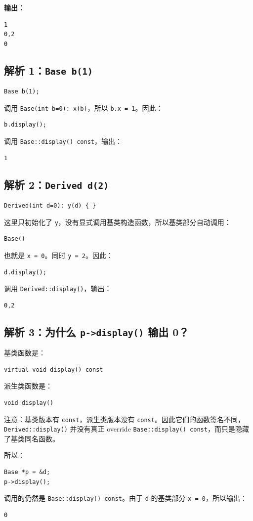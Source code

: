 \documentclass[11pt, a4paper]{article}
\begin{document}
\textbf{输出：}
\begin{lstlisting}
1
0,2
0
\end{lstlisting}

\subsection*{解析 1：\texttt{Base b(1)}}
\begin{lstlisting}
Base b(1);
\end{lstlisting}
调用 \texttt{Base(int b=0): x(b)}，所以 \texttt{b.x = 1}。因此：
\begin{lstlisting}
b.display();
\end{lstlisting}
调用 \texttt{Base::display() const}，输出：
\begin{lstlisting}
1
\end{lstlisting}

\subsection*{解析 2：\texttt{Derived d(2)}}
\begin{lstlisting}
Derived(int d=0): y(d) { }
\end{lstlisting}
这里只初始化了 \texttt{y}，没有显式调用基类构造函数，所以基类部分自动调用：
\begin{lstlisting}
Base()
\end{lstlisting}
也就是 \texttt{x = 0}。同时 \texttt{y = 2}。因此：
\begin{lstlisting}
d.display();
\end{lstlisting}
调用 \texttt{Derived::display()}，输出：
\begin{lstlisting}
0,2
\end{lstlisting}

\subsection*{解析 3：为什么 \texttt{p->display()} 输出 0？}
基类函数是：
\begin{lstlisting}
virtual void display() const
\end{lstlisting}
派生类函数是：
\begin{lstlisting}
void display()
\end{lstlisting}
注意：基类版本有 \texttt{const}，派生类版本没有 \texttt{const}。因此它们的函数签名不同，\texttt{Derived::display()} 并没有真正 override \texttt{Base::display() const}，而只是隐藏了基类同名函数。

所以：
\begin{lstlisting}
Base *p = &d;
p->display();
\end{lstlisting}
调用的仍然是 \texttt{Base::display() const}。由于 \texttt{d} 的基类部分 \texttt{x = 0}，所以输出：
\begin{lstlisting}
0
\end{lstlisting}
\end{document}
